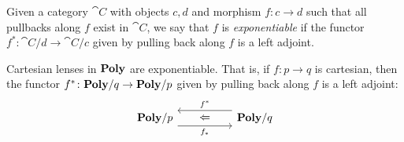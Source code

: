 \documentclass[Book-Poly]{subfiles}
\begin{document}
\begin{definition}
Given a category $\cat{C}$ with objects $c, d$ and morphism $f \colon c \to d$ such that all pullbacks along $f$ exist in $\cat{C}$, we say that $f$ is \emph{exponentiable} if the functor $f^* \colon \cat{C}/d \to \cat{C}/c$ given by pulling back along $f$ is a left adjoint.
\end{definition}


\begin{theorem}\label{thm.cart_exponentiable}
Cartesian lenses in $\mathbf{Poly}$ are exponentiable.
That is, if $f\colon p\to q$ is cartesian, then the functor $f^*\colon\mathbf{Poly}/q\to\mathbf{Poly}/p$ given by pulling back along $f$ is a left adjoint:
\[
\begin{tikzcd}[column sep=50pt, background color=theoremcolor]
	\poly/p\ar[r, shift right=7pt, "f_*"']&
	\poly/q\ar[l, shift right=7pt, "f^*"']\ar[l, phantom, "\Leftarrow"]
\end{tikzcd}
\]
\end{theorem}
\end{document}
